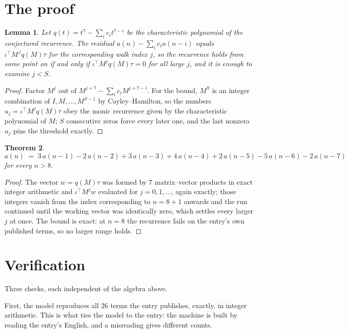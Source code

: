 \documentclass[11pt,a4paper]{article}
\theoremstyle{plain}
\newtheorem{theorem}{Theorem}
\newtheorem{lemma}[theorem]{Lemma}
\theoremstyle{definition}
\begin{document}
\section{The proof}

\begin{lemma}\label{lem:crit}
Let $q(t)=t^{7}-\sum_i c_it^{7-i}$ be the characteristic polynomial of the
conjectured recurrence. The residual $a(n)-\sum_ic_ia(n-i)$ equals
$\iota^{\!\top}M^{\,j}q(M)\tau$ for the corresponding walk index $j$, so the recurrence
holds from some point on if and only if $\iota^{\!\top}M^{j}q(M)\tau=0$ for all large $j$,
and it is enough to examine $j<S$.
\end{lemma}

\begin{proof}
Factor $M^{j}$ out of $M^{j+7}-\sum_ic_iM^{j+7-i}$. For the bound, $M^{S}$
is an integer combination of $I,M,\dots,M^{S-1}$ by Cayley--Hamilton, so the numbers
$u_j=\iota^{\!\top}M^{j}q(M)\tau$ obey the monic recurrence given by the characteristic
polynomial of $M$; $S$ consecutive zeros force every later one, and the last nonzero $u_j$
pins the threshold exactly.
\end{proof}

\begin{theorem}
\[
a(n)\;=\;3\,a(n-1) - 2\,a(n-2) + 3\,a(n-3) + 4\,a(n-4) + 2\,a(n-5) - 5\,a(n-6) - 2\,a(n-7)
\]
for every $n>8$.
\end{theorem}

\begin{proof}
The vector $w=q(M)\tau$ was formed by $7$ matrix--vector products in exact integer
arithmetic and $\iota^{\!\top}M^{j}w$ evaluated for $j=0,1,\dots$, again exactly; those
integers vanish from the index corresponding to $n=8+1$ onwards and the run continued
until the working vector was identically zero, which settles every larger $j$ at once. The bound is exact: at $n=8$ the recurrence fails on the entry's own published terms, so no larger range holds.
\end{proof}

\section{Verification}

Three checks, each independent of the algebra above.

First, the model reproduces all $26$ terms the entry publishes, exactly, in integer
arithmetic. This is what ties the model to the entry: the machine is built by reading the
entry's English, and a misreading gives different counts.
\end{document}
